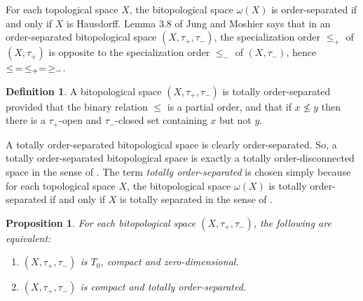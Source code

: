 \documentclass[11pt]{article}
\theoremstyle{plain}
\newtheorem{prop}[thm]{Proposition}
\theoremstyle{definition}
\newtheorem{defn}[thm]{Definition}
\begin{document}
For each topological space $X$, the bitopological space $\omega(X)$ is order-separated if and only if  $X$ is Hausdorff. Lemma 3.8 of Jung and Moshier \cite{JM2008} says that in an order-separated bitopological space $(X,\tau_+,\tau_-)$, the specialization order $\leq_+$ of $(X,\tau_+)$ is opposite to the specialization order $\leq_-$ of  $(X,\tau_-)$,   hence $\leq\thinspace=\thinspace\leq_+= \thinspace \geq_-$.
 
\begin{defn}
A  bitopological space $(X,\tau_+,\tau_-)$ is totally order-separated provided that the binary relation $\leq$  is a partial order, and that if $x\not\leq y$ then there is a $\tau_+$-open  and $\tau_-$-closed set  containing $x$ but not $y$. 
\end{defn}

A totally order-separated bitopological space is clearly order-separated. So, a totally order-separated bitopological space is exactly a totally order-disconnected space in the sense of \cite[Definition 8.12]{JM2006}.  The term \emph{totally order-separated} is chosen simply because for each topological space $X$, the bitopological space $\omega(X)$ is totally order-separated if and only if  $X$ is totally separated in the sense of \cite[page 69]{Johnstone}.
 

\begin{prop}\label{Stone bitopological space}
For each bitopological space $(X,\tau_+,\tau_-)$, the following  are equivalent:
\begin{enumerate}[label=\rm(\arabic*)] \setlength{\itemsep}{0pt} 
\item $(X,\tau_+,\tau_-)$ is  $T_0$, compact and zero-dimensional. 
\item $(X,\tau_+,\tau_-)$ is compact and totally order-separated.
\end{enumerate}
\end{prop}
\end{document}
